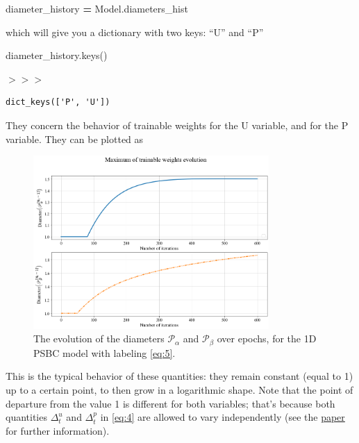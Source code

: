 \documentclass[openany,twoside]{book}
\newenvironment{Shaded}{\begin{snugshade}}{\end{snugshade}}
\newcommand{\NormalTok}[1]{#1}
\newcommand{\OperatorTok}[1]{\textcolor[rgb]{0.81,0.36,0.00}{\textbf{#1}}}
\begin{document}
\begin{Shaded}
\begin{Highlighting}[]
\NormalTok{diameter_history }\OperatorTok{=}\NormalTok{ Model.diameters_hist}
\end{Highlighting}
\end{Shaded}

which will give you a dictionary with two keys: ``U'' and ``P''

\begin{Shaded}
\begin{Highlighting}[]
\NormalTok{diameter_history.keys()}
\end{Highlighting}
\end{Shaded}

\(>>>\)

\begin{verbatim}
dict_keys(['P', 'U'])
\end{verbatim}

They concern the behavior of trainable weights for the U variable, and for the P variable. They can be plotted as
\begin{figure}[htbp]
\centering
\includegraphics[width=0.8\textwidth]{figures/output_43_1.png}
\caption{The evolution of the diameters $\mathscr{P}_{\alpha}$ and $\mathscr{P}_{\beta}$ over epochs, for the 1D PSBC model with labeling \ref{eq:5}.}
\end{figure}

This is the typical behavior of these quantities: they remain constant (equal to 1) up to a certain point, to then grow in a logarithmic shape. Note that the point of departure from the value 1 is different for both variables; that's because both quantities \(\Delta_t^u\) and \(\Delta_t^p\) in \eqref{eq:4} are allowed to vary independently (see the \href{https://arxiv.org/abs/2009.02467}{paper} for further information).
\end{document}
